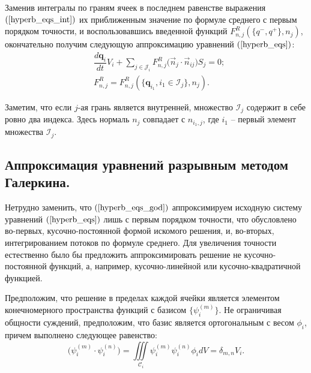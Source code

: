 \documentclass[14pt, a4paper, fleqn]{extreport}
\begin{document}
	Заменив интегралы по граням ячеек в последнем равенстве выражения $(\ref{hyperb_eqs_int})$ 
	их приближенным значение по формуле среднего с первым порядком точности,
	и воспользовавшись введенной функций $F_{n,j}^R(\lbrace q^{-}, q^{+} \rbrace, n_j)$,
	окончательно получим следующую аппроксимацию уравнений $(\ref{hyperb_eqs})$:
	\begin{equation}
	\label{hyperb_eqs_god} \boxed{
	\begin{split}
		&\dfrac{d \textbf{q}_i}{d t}V_i
			+ \sum\limits_{j \in \mathcal{J}_i} F_{n,j}^R \Big( \vec{n}_{j} \cdot \vec{n}_{ij} \Big) S_j = 0;
		\\
		&F_{n,j}^R = F_{n,j}^R(\lbrace \textbf{q}_{i_1}, i_1 \in \mathcal{I}_j \rbrace, n_{j}).
	\end{split}}
	\end{equation}
	
	Заметим, что если $j$-ая грань является внутренней, множество $\mathcal{I}_j$ содержит в себе ровно два индекса.
	Здесь нормаль $n_j$ совпадает с $n_{i_1,j}$, где $i_1$ -- первый элемент множества $\mathcal{I}_j$.
	
	\subsection{Аппроксимация уравнений разрывным методом Галеркина.}

	Нетрудно заменить, что $(\ref{hyperb_eqs_god})$ аппроксимируем исходную систему 
	уравнений $(\ref{hyperb_eqs})$ лишь с первым порядком точности,
	что обусловлено во-первых, кусочно-постоянной формой искомого решения, и, во-вторых, интегрированием потоков по формуле среднего.
	Для увеличения точности естественно было бы предложить аппроксимировать решение не кусочно-постоянной функций,
	а, например, кусочно-линейной или кусочно-квадратичной функцией.
	
	Предположим, что решение в пределах каждой ячейки является элементом
	конечномерного пространства функций с базисом ${\lbrace \psi_i^{(m)} \rbrace}$.
	Не ограничивая общности суждений, предположим, что базис является ортогональным с весом $\phi_i$, причем 
	выполнено следующее равенство:
	\begin{equation}
	\label{basis_cond}
		\Big(\psi_i^{(m)} \cdot \psi_i^{(n)} \Big)
			= \iiint\limits_{\mathcal{C}_i} \psi_i^{(m)} \psi_i^{(n)} \phi_i dV
			= \delta_{m,n} V_i.
	\end{equation}
	
\end{document}
